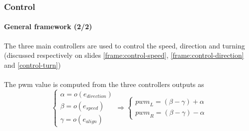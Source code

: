 \documentclass[10pt]{beamer}
\begin{document}

\begin{frame}
\frametitle{Control}
\framesubtitle{General framework (2/2)}
The three main controllers are used to control the speed, direction and turning (discussed respectively on slides \ref{frame:control-speed}, \ref{frame:control-direction} and \ref{control-turn}) \\~\\
The pwm value is computed from the three controllers outputs as
$$ 
\left\{
    \begin{array}{ll}
		\alpha = o(e_{direction}) \\[0.3cm]
		\beta = o(e_{speed}) \\[0.3cm]
		\gamma = o(e_{align})
	\end{array}
\right.
\Rightarrow
\left\{
    \begin{array}{ll}
		{pwm}_L =  (\beta -\gamma) + \alpha \\
		{pwm}_R = (\beta - \gamma) - \alpha
	\end{array}
\right.
$$
\end{frame}

\end{document}

